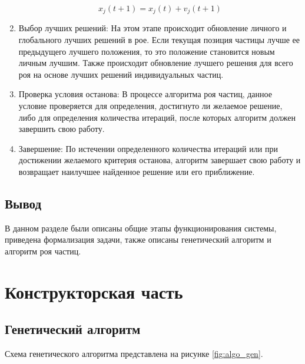 \documentclass[12pt]{report}
\begin{document}
\begin{enumerate}
    \begin{equation}
        x_{j}(t+1) = x_{j}(t) + v_{j}(t+1)
    \end{equation}
    
    \item Выбор лучших решений:
   На этом этапе происходит обновление личного и глобального лучших решений в рое. 
   Если текущая позиция частицы лучше ее предыдущего лучшего положения, то это положение становится новым личным лучшим. 
   Также происходит обновление лучшего решения для всего роя на основе лучших решений индивидуальных частиц.

    \item Проверка условия останова:
   В процессе алгоритма роя частиц, данное условие проверяется для определения, достигнуто ли желаемое решение, либо для определения количества итераций, после которых алгоритм должен завершить свою работу.

    \item Завершение:
   По истечении определенного количества итераций или при достижении желаемого критерия останова, алгоритм завершает свою работу и возвращает наилучшее найденное решение или его приближение.
\end{enumerate}

\section*{Вывод}
В данном разделе были описаны общие этапы функционирования системы, приведена формализация задачи, также описаны генетический алгоритм и алгоритм роя частиц.
\clearpage

\chapter{Конструкторская часть}
\section{Генетический алгоритм}
Схема генетического алгоритма представлена на рисунке \ref{fig:algo_gen}.
\end{document}
